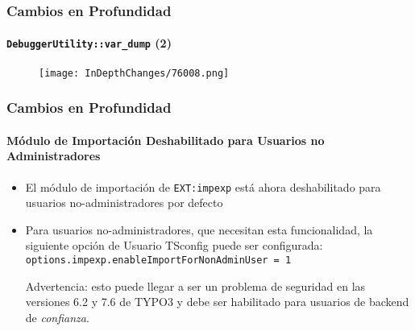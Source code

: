 \begin{frame}[fragile]
	\frametitle{Cambios en Profundidad}
	\framesubtitle{\texttt{DebuggerUtility::var\_dump} (2)}

	\begin{figure}
		\texttt{[image: InDepthChanges/76008.png]}
	\end{figure}

\end{frame}

\begin{frame}[fragile]
	\frametitle{Cambios en Profundidad}
	\framesubtitle{Módulo de Importación Deshabilitado para Usuarios no Administradores}

	\begin{itemize}

		\item El módulo de importación de \texttt{EXT:impexp} está ahora deshabilitado para usuarios no-administradores por defecto

		\item Para usuarios no-administradores, que necesitan esta funcionalidad, la siguiente opción de Usuario TSconfig
			puede ser configurada:\newline
			\texttt{options.impexp.enableImportForNonAdminUser = 1}

			\vspace{0.5cm}

			\begingroup
				\color{typo3red}
				Advertencia: esto puede llegar a ser un problema de seguridad en las versiones 6.2 y 7.6 de TYPO3
				y debe ser habilitado para usuarios de backend de \textit{confianza}.
			\endgroup

	\end{itemize}

\end{frame}

